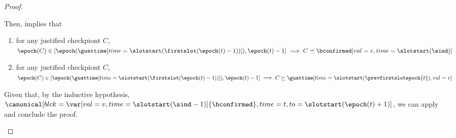 \documentclass{article}
\begin{document}
\begin{proof}
\begin{description}
        Then,  implies that
        \begin{enumerate}
            \item for any justified checkpiont $C$, $\epoch(C) \in [\epoch(\guattime[time=\slotstart(\firstslot(\epoch(t)-1))]),\epoch(t)-1] \implies C  \preceq \bconfirmed[val=v,time=\slotstart(\sind)]$
            \item   for any justified checkpiont $C$, $\epoch(C) \in [\epoch(\guattime[time=\slotstart(\firstslot(\epoch(t)-1))]),\epoch(t)-1] \implies C  \succeq \guattime[time=\slotstart(\prevfirstslotepoch{t}),val=v]$
        \end{enumerate}

        Given that, by the inductive hypothesis, $\canonical[blck={\var[val=v,time=\slotstart(\sind-1)]{\bconfirmed}},time=t, to=\slotstart(\epoch(t)+1)]$,
        we can apply  and conclude the proof.










\end{description}
\end{proof}
\end{document}
